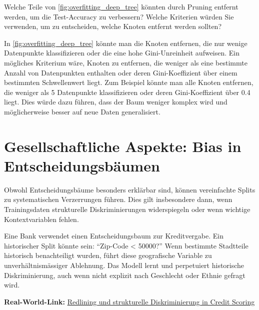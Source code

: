 \begin{myexercise}
    Welche Teile von \cref{fig:overfitting_deep_tree} könnten durch Pruning entfernt werden, um die Test-Accuracy zu verbessern? Welche Kriterien würden Sie verwenden, um zu entscheiden, welche Knoten entfernt werden sollten?
    \begin{myanswer}
        In \cref{fig:overfitting_deep_tree} könnte man die Knoten entfernen, die nur wenige Datenpunkte klassifizieren oder die eine hohe Gini-Unreinheit aufweisen. Ein mögliches Kriterium wäre, Knoten zu entfernen, die weniger als eine bestimmte Anzahl von Datenpunkten enthalten oder deren Gini-Koeffizient über einem bestimmten Schwellenwert liegt.
        Zum Beispiel könnte man alle Knoten entfernen, die weniger als 5 Datenpunkte klassifizieren oder deren Gini-Koeffizient über 0.4 liegt. Dies würde dazu führen, dass der Baum weniger komplex wird und möglicherweise besser auf neue Daten generalisiert.
    \end{myanswer}
\end{myexercise}

\section{Gesellschaftliche Aspekte: Bias in Entscheidungsbäumen}

\begin{mydefinition}
    Obwohl Entscheidungsbäume besonders erklärbar sind, können vereinfachte Splits zu systematischen Verzerrungen führen. Dies gilt insbesondere dann, wenn Trainingsdaten strukturelle Diskriminierungen widerspiegeln oder wenn wichtige Kontextvariablen fehlen.
\end{mydefinition}

\begin{myexample}
    Eine Bank verwendet einen Entscheidungsbaum zur Kreditvergabe. Ein historischer Split könnte sein: \enquote{Zip-Code < 50000?} Wenn bestimmte Stadtteile historisch benachteiligt wurden, führt diese geografische Variable zu unverhältnismässiger Ablehnung. Das Modell lernt und perpetuiert historische Diskriminierung, auch wenn nicht explizit nach Geschlecht oder Ethnie gefragt wird.

    \textbf{Real-World-Link:} \href{https://en.wikipedia.org/wiki/Redlining}{Redlining und strukturelle Diskriminierung in Credit Scoring}
\end{myexample}

